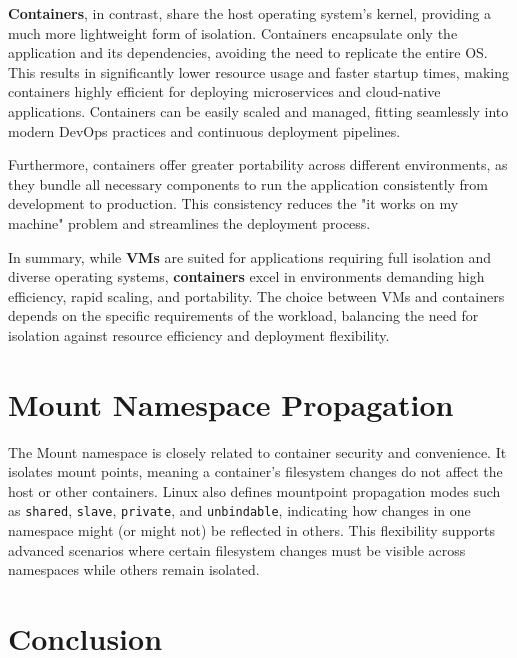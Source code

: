 \textbf{Containers}, in contrast, share the host operating system's kernel, providing a much more lightweight form of isolation. Containers encapsulate only the application and its dependencies, avoiding the need to replicate the entire OS. This results in significantly lower resource usage and faster startup times, making containers highly efficient for deploying microservices and cloud-native applications. Containers can be easily scaled and managed, fitting seamlessly into modern DevOps practices and continuous deployment pipelines.

Furthermore, containers offer greater portability across different environments, as they bundle all necessary components to run the application consistently from development to production. This consistency reduces the "it works on my machine" problem and streamlines the deployment process.

In summary, while \textbf{VMs} are suited for applications requiring full isolation and diverse operating systems, \textbf{containers} excel in environments demanding high efficiency, rapid scaling, and portability. The choice between VMs and containers depends on the specific requirements of the workload, balancing the need for isolation against resource efficiency and deployment flexibility.


\section{Mount Namespace Propagation}

The Mount namespace is closely related to container security and convenience. It isolates mount points, meaning a container’s filesystem changes do not affect the host or other containers. Linux also defines mountpoint propagation modes such as \texttt{shared}, \texttt{slave}, \texttt{private}, and \texttt{unbindable}, indicating how changes in one namespace might (or might not) be reflected in others. This flexibility supports advanced scenarios where certain filesystem changes must be visible across namespaces while others remain isolated.

\section{Conclusion}


